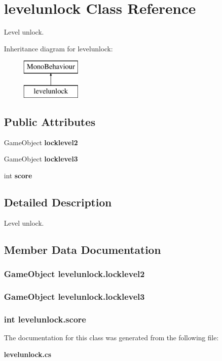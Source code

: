 \section{levelunlock Class Reference}
\label{classlevelunlock}


Level unlock.  


Inheritance diagram for levelunlock\+:\begin{figure}[H]
\begin{center}
\leavevmode
\includegraphics[height=2.000000cm]{classlevelunlock}
\end{center}
\end{figure}
\subsection*{Public Attributes}
\begin{DoxyCompactItemize}
\item 
Game\+Object {\bf locklevel2}
\item 
Game\+Object {\bf locklevel3}
\item 
int {\bf score}
\end{DoxyCompactItemize}


\subsection{Detailed Description}
Level unlock. 



\subsection{Member Data Documentation}
\subsubsection[{locklevel2}]{\setlength{\rightskip}{0pt plus 5cm}Game\+Object levelunlock.\+locklevel2}\label{classlevelunlock_a5a24b09ea22a90b04eafe71289dc12c6}
\subsubsection[{locklevel3}]{\setlength{\rightskip}{0pt plus 5cm}Game\+Object levelunlock.\+locklevel3}\label{classlevelunlock_a1fc2b8c225eaae8fcf77a8dbe72bccf6}
\subsubsection[{score}]{\setlength{\rightskip}{0pt plus 5cm}int levelunlock.\+score}\label{classlevelunlock_a5a03d2907fc401172d2cdbec9eb8f259}


The documentation for this class was generated from the following file\+:\begin{DoxyCompactItemize}
\item 
{\bf levelunlock.\+cs}\end{DoxyCompactItemize}
